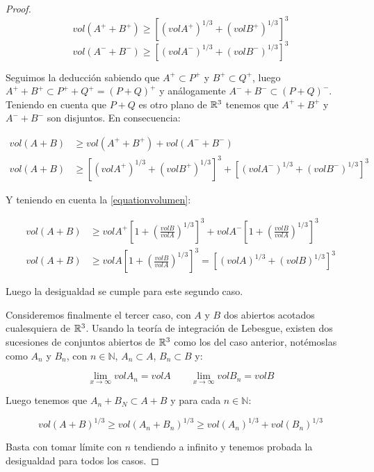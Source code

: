 \begin{proof}
\begin{equation*}
    vol (A^+ + B^+) \geq \left[ (vol A^+)^{1/3} + (vol B^+)^{1/3} \right]^3
\end{equation*}
\begin{equation*}
    vol (A^- + B^-) \geq \left[ (vol A^-)^{1/3} + (vol B^-)^{1/3} \right]^3
\end{equation*}

Seguimos la deducción sabiendo que $A^+ \subset P^+$ y $B^+ \subset Q^+$, luego $A^+ + B^+ \subset P^+ + Q^+ = (P+Q)^+$ y análogamente $A^- + B^- \subset (P+Q)^-$. Teniendo en cuenta que $P+Q$ es otro plano de $\mathbb{R}^3$ tenemos que $A^+ + B^+$ y $A^- + B^-$ son disjuntos. En consecuencia:

\begin{align*}
    vol (A+B) &\geq vol(A^+ + B^+) + vol(A^- + B^-) \\ 
    vol (A+B) &\geq \left[ (vol A^+)^{1/3} + (vol B^+)^{1/3} \right]^3 + \left[ (vol A^-)^{1/3} + (vol B^-)^{1/3} \right]^3
\end{align*}

Y teniendo en cuenta la \autoref{equationvolumen}:

\begin{align*}
    vol (A+B) &\geq vol A^+ \left[ 1 + \left( \frac{vol B}{vol A} \right)^{1/3}  \right]^3 + vol A^- \left[ 1 + \left( \frac{vol B}{vol A} \right)^{1/3}  \right]^3 \\
    vol (A+B) &\geq vol A \left[ 1 + \left( \frac{vol B}{vol A} \right)^{1/3}  \right]^3 = \left[ (vol A)^{1/3} + (vol B)^{1/3} \right]^3
\end{align*}

Luego la desigualdad se cumple para este segundo caso.

Consideremos finalmente el tercer caso, con $A$ y $B$ dos abiertos acotados cualesquiera de $\mathbb{R}^3$. Usando la teoría de integración de Lebesgue, existen dos sucesiones de conjuntos abiertos de $\mathbb{R}^3$ como los del caso anterior, notémoslas como $A_n$ y $B_n$, con $n \in \mathbb{N}$, $A_n \subset A$, $B_n \subset B$ y:

\begin{equation*}
    \lim_{x \to \infty} vol A_n = vol A \qquad \lim_{x \to \infty} vol B_n = vol B
\end{equation*}

Luego tenemos que $A_n + B_N \subset A + B$ y para cada $n \in \mathbb{N}$:

\begin{equation*}
    vol (A+B)^{1/3} \geq vol (A_n+B_n)^{1/3} \geq vol (A_n) ^{1/3} + vol(B_n)^{1/3}
\end{equation*}

Basta con tomar límite con $n$ tendiendo a infinito y tenemos probada la desigualdad para todos los casos.
\end{proof}


